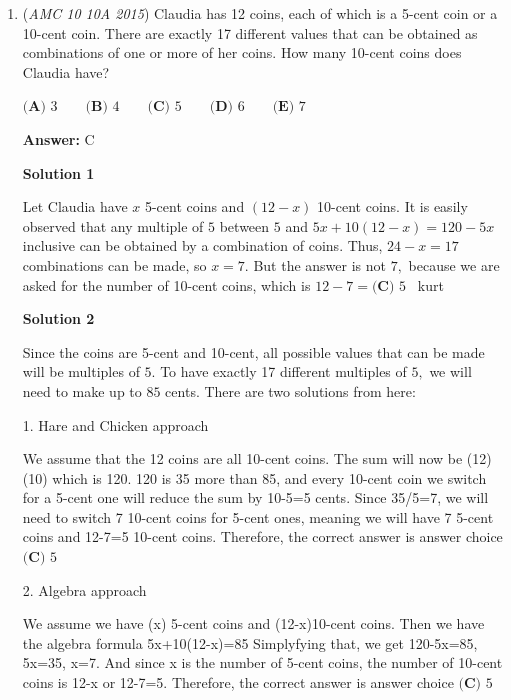 \begin{enumerate}
 We now can factor this quadratic. We must find two terms that multiply to $\pi^2 -1$ and add to $2\pi$. 

 These terms are $\pi+1$ and $\pi-1$. 

 Subtracting one from the other, we get $2$.

 Thus, the answer is $\boxed{\textbf{(C) }2}$

 -DuckDuckGooseGoose

 


	\item (\textit{AMC 10 10A 2015}) Claudia has 12 coins, each of which is a 5-cent coin or a 10-cent coin. There are exactly 17 different values that can be obtained as combinations of one or more of her coins. How many 10-cent coins does Claudia have?


 $\textbf{(A) }3\qquad\textbf{(B) }4\qquad\textbf{(C) }5\qquad\textbf{(D) }6\qquad\textbf{(E) }7$

 \textbf{Answer: }C



\textbf{Solution 1}

Let Claudia have $x$ 5-cent coins and $\left( 12 - x \right)$ 10-cent coins. It is easily observed that any multiple of $5$ between $5$ and $5x + 10(12 - x) = 120 - 5x$ inclusive can be obtained by a combination of coins. Thus, $24 - x = 17$ combinations can be made, so $x = 7$. But the answer is not $7,$ because we are asked for the number of 10-cent coins, which is $12 - 7 = \boxed{\textbf{(C) } 5}$ ~kurt

 



\textbf{Solution 2}

Since the coins are 5-cent and 10-cent, all possible values that can be made will be multiples of $5.$ To have exactly 17 different multiples of $5,$ we will need to make up to $85$ cents. There are two solutions from here:

 1. Hare and Chicken approach

 We assume that the 12 coins are all 10-cent coins. The sum will now be (12)(10) which is 120. 120 is 35 more than 85, and every 10-cent coin we switch for a 5-cent one will reduce the sum by 10-5=5 cents. Since 35/5=7, we will need to switch 7 10-cent coins for 5-cent ones, meaning we will have 7 5-cent coins and 12-7=5 10-cent coins. Therefore, the correct answer is answer choice $\boxed{\textbf{(C) } 5}$

 
2. Algebra approach

 We assume we have (x) 5-cent coins and (12-x)10-cent coins. Then we have the algebra formula 5x+10(12-x)=85 Simplyfying that, we get 120-5x=85, 5x=35, x=7. And since x is the number of 5-cent coins, the number of 10-cent coins is 12-x or 12-7=5. Therefore, the correct answer is answer choice $\boxed{\textbf{(C) } 5}$


\end{enumerate}
